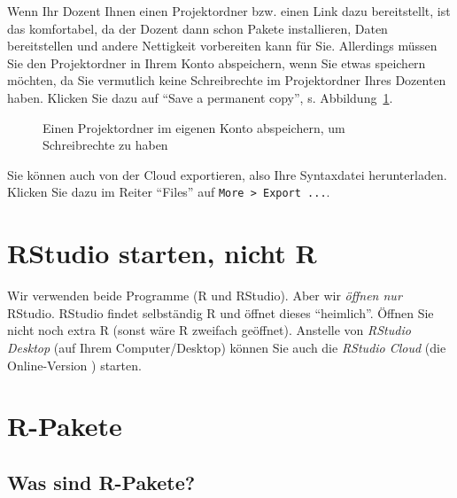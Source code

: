 \documentclass[
  a4paper,
]{scrbook}
\theoremstyle{definition}
\theoremstyle{definition}
\theoremstyle{definition}
\theoremstyle{remark}
\begin{document}
Wenn Ihr Dozent Ihnen einen Projektordner bzw. einen Link dazu
bereitstellt, ist das komfortabel, da der Dozent dann schon Pakete
installieren, Daten bereitstellen und andere Nettigkeit vorbereiten kann
für Sie. Allerdings müssen Sie den Projektordner in Ihrem Konto
abspeichern, wenn Sie etwas speichern möchten, da Sie vermutlich keine
Schreibrechte im Projektordner Ihres Dozenten haben. Klicken Sie dazu
auf ``Save a permanent copy'', s. Abbildung~\ref{fig-perm-copy}.

\begin{figure}


\caption{\label{fig-perm-copy}Einen Projektordner im eigenen Konto
abspeichern, um Schreibrechte zu haben}

\end{figure}%

Sie können auch von der Cloud exportieren, also Ihre Syntaxdatei
herunterladen. Klicken Sie dazu im Reiter ``Files'' auf
\texttt{More\ \textgreater{}\ Export\ ...}.

\section{RStudio starten, nicht R}\label{rstudio-starten-nicht-r}

Wir verwenden beide Programme (R und RStudio). Aber wir \emph{öffnen
nur} RStudio. RStudio findet selbständig R und öffnet dieses
``heimlich''. Öffnen Sie nicht noch extra R (sonst wäre R zweifach
geöffnet). Anstelle von \emph{RStudio Desktop} (auf Ihrem
Computer/Desktop) können Sie auch die \emph{RStudio Cloud} (die
Online-Version ) starten.

\section{R-Pakete}\label{r-pakete}

\subsection{Was sind R-Pakete?}\label{was-sind-r-pakete}
\end{document}
